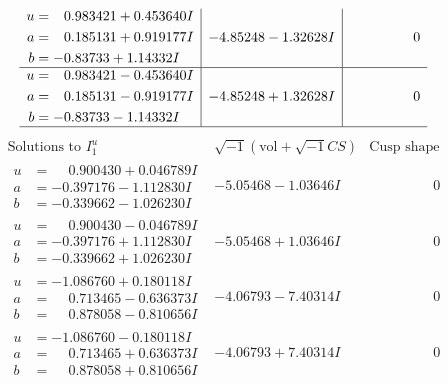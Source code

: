 \documentclass[1p]{elsarticle_modified}
\theoremstyle{definition}
\newcommand{\I}{\sqrt{-1}}
\begin{document}
$$\begin{array}{c|c|c}
\begin{aligned}
u &= \phantom{-}0.983421 + 0.453640 I \\
a &= \phantom{-}0.185131 + 0.919177 I \\
b &= -0.83733 + 1.14332 I\end{aligned}
 & -4.85248 - 1.32628 I & \phantom{-0.000000 } 0 \\ \hline\begin{aligned}
u &= \phantom{-}0.983421 - 0.453640 I \\
a &= \phantom{-}0.185131 - 0.919177 I \\
b &= -0.83733 - 1.14332 I\end{aligned}
 & -4.85248 + 1.32628 I & \phantom{-0.000000 } 0\\
 \hline 
 \end{array}$$\newpage$$\begin{array}{c|c|c}  
\text{Solutions to }I^u_{1}& \I (\text{vol} + \sqrt{-1}CS) & \text{Cusp shape}\\
 \hline 
\begin{aligned}
u &= \phantom{-}0.900430 + 0.046789 I \\
a &= -0.397176 - 1.112830 I \\
b &= -0.339662 - 1.026230 I\end{aligned}
 & -5.05468 - 1.03646 I & \phantom{-0.000000 } 0 \\ \hline\begin{aligned}
u &= \phantom{-}0.900430 - 0.046789 I \\
a &= -0.397176 + 1.112830 I \\
b &= -0.339662 + 1.026230 I\end{aligned}
 & -5.05468 + 1.03646 I & \phantom{-0.000000 } 0 \\ \hline\begin{aligned}
u &= -1.086760 + 0.180118 I \\
a &= \phantom{-}0.713465 - 0.636373 I \\
b &= \phantom{-}0.878058 - 0.810656 I\end{aligned}
 & -4.06793 - 7.40314 I & \phantom{-0.000000 } 0 \\ \hline\begin{aligned}
u &= -1.086760 - 0.180118 I \\
a &= \phantom{-}0.713465 + 0.636373 I \\
b &= \phantom{-}0.878058 + 0.810656 I\end{aligned}
 & -4.06793 + 7.40314 I & \phantom{-0.000000 } 0 \\ \hline\begin{aligned}

\end{aligned}
\end{array}$$
\end{document}
